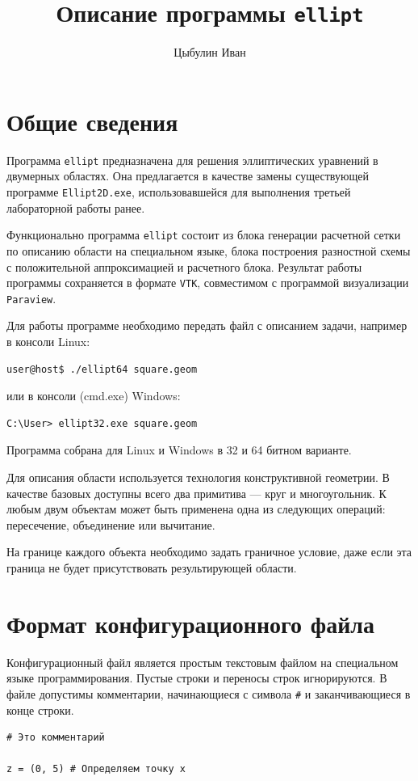 \documentclass[12pt]{article}
\author{Цыбулин Иван}
\title{Описание программы \texttt{ellipt}}
\begin{document}
\maketitle

\tableofcontents

\section{Общие сведения}

Программа \texttt{ellipt} предназначена для решения эллиптических уравнений в двумерных областях. Она предлагается в качестве замены существующей программе \texttt{Ellipt2D.exe}, использовавшейся для выполнения третьей лабораторной работы ранее.

Функционально программа \texttt{ellipt} состоит из блока генерации расчетной сетки по описанию области на специальном языке, блока построения разностной схемы с положительной аппроксимацией и расчетного блока. Результат работы программы сохраняется в формате \texttt{VTK}, совместимом с программой визуализации \texttt{Paraview}.

Для работы программе необходимо передать файл с описанием задачи, например в консоли Linux:
\begin{verbatim}
user@host$ ./ellipt64 square.geom
\end{verbatim}
или в консоли (cmd.exe) Windows:
\begin{verbatim}
C:\User> ellipt32.exe square.geom
\end{verbatim}
Программа собрана для Linux и Windows в 32 и 64 битном варианте.

Для описания области используется технология конструктивной геометрии. В качестве базовых доступны всего два примитива --- круг и многоугольник. К любым двум объектам может быть применена одна из следующих операций: пересечение, объединение или вычитание.

На границе каждого объекта необходимо задать граничное условие, даже если эта граница не будет присутствовать результирующей области.

\section{Формат конфигурационного файла}
Конфигурационный файл является простым текстовым файлом на специальном языке программирования. 
Пустые строки и переносы строк игнорируются. В файле допустимы комментарии, начинающиеся с символа \verb|#| и заканчивающиеся в конце строки.
\begin{verbatim}
# Это комментарий

z = (0, 5) # Определяем точку x
\end{verbatim}
\end{document}
